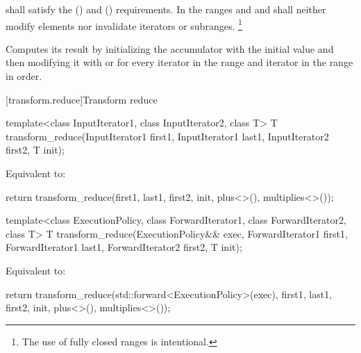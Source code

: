 \begin{itemdescr}
\pnum
\requires
{} shall satisfy
the  ()
and  () requirements.
In the ranges  and
 and 
shall neither modify elements nor invalidate iterators or subranges.%
\footnote{The use of fully closed ranges is intentional.}

\pnum
\effects
Computes its result by
initializing the accumulator  with the initial value 
and then modifying it with
 or
for every iterator  in the range 
and iterator  in the range 
in order.
\end{itemdescr}

[transform.reduce]{Transform reduce}
%
\begin{itemdecl}
template<class InputIterator1, class InputIterator2, class T>
  T transform_reduce(InputIterator1 first1, InputIterator1 last1,
                     InputIterator2 first2,
                     T init);
\end{itemdecl}

\begin{itemdescr}
\pnum
\effects
Equivalent to:
\begin{codeblock}
return transform_reduce(first1, last1, first2, init, plus<>(), multiplies<>());
\end{codeblock}
\end{itemdescr}

%
\begin{itemdecl}
template<class ExecutionPolicy,
         class ForwardIterator1, class ForwardIterator2, class T>
  T transform_reduce(ExecutionPolicy&& exec,
                     ForwardIterator1 first1, ForwardIterator1 last1,
                     ForwardIterator2 first2,
                     T init);
\end{itemdecl}

\begin{itemdescr}
\pnum
\effects
Equivalent to:
\begin{codeblock}
return transform_reduce(std::forward<ExecutionPolicy>(exec),
                        first1, last1, first2, init, plus<>(), multiplies<>());
\end{codeblock}
\end{itemdescr}


